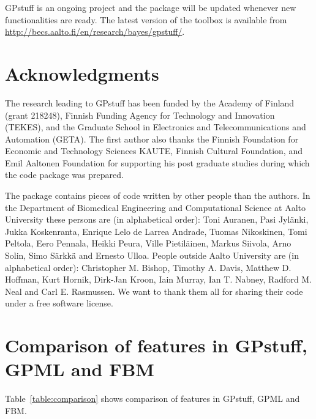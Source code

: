 \documentclass[twoside,11pt]{article}
\newcommand{\pkg}[1]{{\fontseries{b}\selectfont #1}}
\begin{document}
\pkg{GPstuff} is an ongoing project and the package will be updated
whenever new functionalities are ready. The latest version of the
toolbox is available from
\url{http://becs.aalto.fi/en/research/bayes/gpstuff/}. 

\section*{Acknowledgments}

The research leading to \pkg{GPstuff} has been funded by the Academy
of Finland (grant 218248), Finnish Funding Agency for Technology and
Innovation (TEKES), and the Graduate School in Electronics and
Telecommunications and Automation (GETA). The first author also thanks
the Finnish Foundation for Economic and Technology Sciences KAUTE,
Finnish Cultural Foundation, and Emil Aaltonen Foundation for
supporting his post graduate studies during which the code package was
prepared.

The package contains pieces of code written by other people than the
authors. In the Department of Biomedical Engineering and Computational
Science at Aalto University these persons are (in alphabetical order):
Toni Auranen, Pasi Jyl{\"a}nki, Jukka Koskenranta, Enrique Lelo de
Larrea Andrade, Tuomas Nikoskinen, Tomi Peltola, Eero Pennala, Heikki
Peura, Ville Pietil{\"a}inen, Markus Siivola, Arno Solin, Simo
S{\"a}rkk{\"a} and Ernesto Ulloa. People outside Aalto University are
(in alphabetical order): Christopher M. Bishop, Timothy A. Davis,
Matthew D. Hoffman, Kurt Hornik, Dirk-Jan Kroon, Iain Murray, Ian T.
Nabney, Radford M. Neal and Carl E. Rasmussen. We want to thank them all
for sharing their code under a free software license.




 \appendix

\section{Comparison of features in GPstuff, 
GPML and FBM}\label{appendix:comparison}

Table~\ref{table:comparison} shows comparison of 
features in GPstuff, GPML and FBM.
\end{document}
